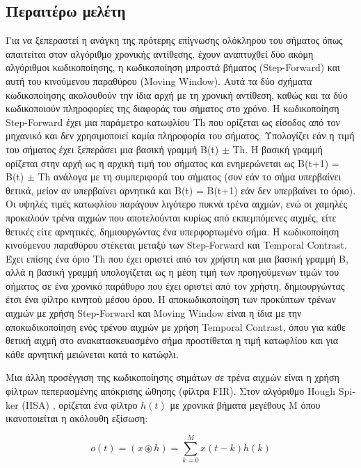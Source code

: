 \documentclass[12pt]{report}
\begin{document}
\subsection{Περαιτέρω μελέτη}

Για να ξεπεραστεί η ανάγκη της πρότερης επίγνωσης ολόκληρου του σήματος όπως απαιτείται στον αλγόριθμο χρονικής αντίθεσης, έχουν αναπτυχθεί δύο ακόμη αλγόριθμοι κωδικοποίησης, η κωδικοποίηση μπροστά βήματος (\textlatin{Step-Forward}) και αυτή του κινούμενου παραθύρου (\textlatin{Moving Window}). Αυτά τα δύο σχήματα κωδικοποίησης ακολουθούν την ίδια αρχή με τη χρονική αντίθεση, καθώς και τα δύο κωδικοποιούν πληροφορίες της διαφοράς του σήματος στο χρόνο. Η κωδικοποίηση \textlatin{Step-Forward} έχει μια παράμετρο κατωφλίου \textlatin{Th} που ορίζεται ως είσοδος από τον μηχανικό και δεν χρησιμοποιεί καμία πληροφορία του σήματος. Υπολογίζει εάν η τιμή του σήματος έχει ξεπεράσει μια βασική γραμμή \textlatin{B(t) \(\pm\) Th}. Η βασική γραμμή ορίζεται στην αρχή ως η αρχική τιμή του σήματος και ενημερώνεται ως \textlatin{B(t+1) = B(t) \(\pm\) Th} ανάλογα με τη συμπεριφορά του σήματος (συν εάν το σήμα υπερβαίνει θετικά, μείον αν υπερβαίνει αρνητικά και \textlatin{B(t) = B(t+1)} εάν δεν υπερβαίνει το όριο). Οι υψηλές τιμές κατωφλίου παράγουν λιγότερο πυκνά τρένα αιχμών, ενώ οι χαμηλές προκαλούν τρένα αιχμών που αποτελούνται κυρίως από εκπεμπόμενες αιχμές, είτε θετικές είτε αρνητικές, δημιουργώντας ένα υπερφορτωμένο σήμα. Η κωδικοποίηση κινούμενου παραθύρου στέκεται μεταξύ των \textlatin{Step-Forward} και \textlatin{Temporal Contrast}. Έχει επίσης ένα όριο \textlatin{Th} που έχει οριστεί από τον χρήστη και μια βασική γραμμή Β, αλλά η βασική γραμμή υπολογίζεται ως η μέση τιμή των προηγούμενων τιμών του σήματος σε ένα χρονικό παράθυρο που έχει οριστεί από τον χρήστη, δημιουργώντας έτσι ένα φίλτρο κινητού μέσου όρου. Η αποκωδικοποίηση των προκύπτων τρένων αιχμών με χρήση \textlatin{Step-Forward} και \textlatin{Moving Window} είναι η ίδια με την αποκωδικοποίηση ενός τρένου αιχμών με χρήση \textlatin{Temporal Contrast}, όπου για κάθε θετική αιχμή στο ανακατασκευασμένο σήμα προστίθεται η τιμή κατωφλίου και για κάθε αρνητική μειώνεται κατά το κατώφλι.

Μια άλλη προσέγγιση της κωδικοποίησης σημάτων σε τρένα αιχμών είναι η χρήση φίλτρων πεπερασμένης απόκρισης ώθησης (φίλτρα \textlatin{FIR}). Στον αλγόριθμο \textlatin{Hough Spiker (HSA)} \cite{Gers1999}, ορίζεται ένα φίλτρο \(h(t)\) με χρονικά βήματα μεγέθους Μ όπου ικανοποιείται η ακόλουθη εξίσωση:

\begin{equation}
    o(t)=(x\circledast h)=\sum_{k=0}^{M}x(t-k)h(k)
\end{equation}
\end{document}
